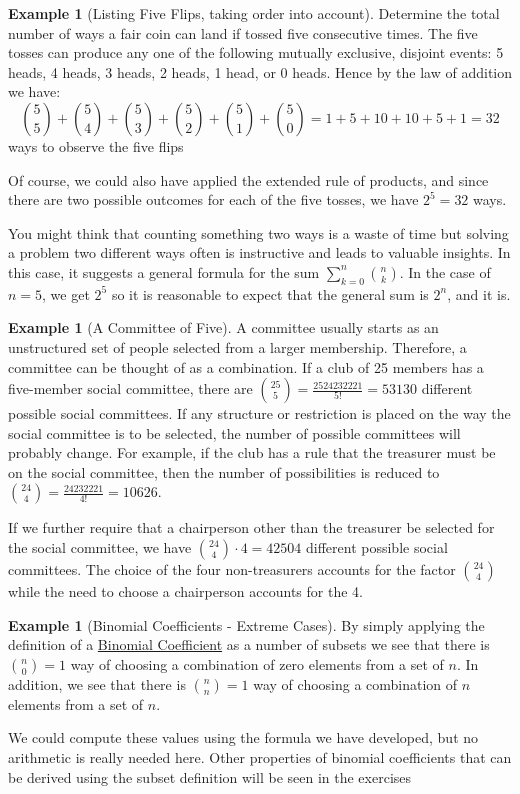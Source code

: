 \documentclass[10pt,]{book}
\theoremstyle{plain}
\theoremstyle{definition}
\newtheorem{example}[theorem]{Example}
\begin{document}
\begin{example}[Listing Five Flips, taking order into account]\label{five-flips}
Determine the total number of ways a fair coin can land if tossed five consecutive times. The five tosses can produce any one of the following mutually exclusive, disjoint events: 5 heads, 4 heads, 3 heads, 2 heads, 1 head, or 0 heads. Hence by the law of addition we have:
\[\binom{5}{5}+\binom{5}{4}+\binom{5}{3}+\binom{5}{2}+\binom{5}{1}+\binom{5}{0}= 1 + 5 +10+10+5+1 = 32\] ways to observe the five flips%
\par
 Of course, we could also have applied the extended rule of products, and since there are two possible outcomes for each of the five tosses, we have \(2^5 = 32\) ways.%
\end{example}
\par
You might think that counting something two ways is a waste of time but solving a problem two different ways often is instructive and leads to valuable insights. In this case, it suggests a general formula for the sum 
\(\sum_{k=0}^n \binom{n}{k}\). In the case of \(n = 5\), we get \(2^5\) so it is reasonable to expect that the general sum is \(2^n\), and it is.%
\begin{example}[A Committee of Five]\label{committee-of-five}
A committee usually starts as an unstructured set of people selected from a larger membership. Therefore, a committee can be thought of as a combination. If a club of 25 members has a five-member social committee, there are \(\binom{25}{5}=\frac{25 24 23 22 21}{5!} = 53130\) different possible social committees. If any structure or restriction is placed on the way the social committee is to be selected, the number of possible committees will probably change. For example, if the club has a rule that the treasurer must be on the social committee, then the number of possibilities is reduced to \(\binom{24}{4}=\frac{24 23 22 21}{4!} = 10626\). %
\par
 If we further require that a chairperson other than the treasurer be selected for the social committee, we have  \(\binom{24}{4} \cdot 4 = 42504\) different possible social committees. The choice of the four non-treasurers accounts for the factor \(\binom{24}{4}\) while the need to choose a chairperson accounts for the 4.%
\end{example}
\begin{example}[Binomial Coefficients - Extreme Cases]\label{extreme-binomial-cases}
By simply applying the definition of a \hyperref[binomial-coefficient]{Binomial Coefficient} as a number of subsets we see that there is \(\binom{n}{0} = 1\) way of choosing a combination of zero elements from a set of \(n\). In addition, we see that   there is \(\binom{n}{n} = 1\) way of choosing a combination of \(n\) elements from a set of \(n\). %
\par
We could compute these values using the formula we have developed, but no arithmetic is really needed here.  Other properties of binomial coefficients that can be derived using the subset definition will be seen in the exercises%
\end{example}
\typeout{************************************************}
\typeout{************************************************}
\end{document}
